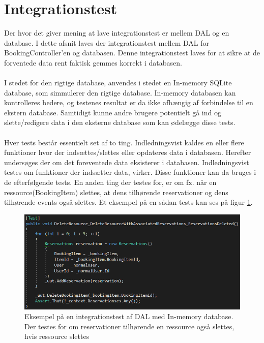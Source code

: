 \section{Integrationstest}
Der hvor det giver mening at lave integrationstest er mellem DAL og en database. I dette afsnit laves der integrationstest mellem DAL for BookingController'en og databasen. Denne integrationstest laves for at sikre at de forventede data rent faktisk gemmes korrekt i databasen. 
\\ \\
I stedet for den rigtige database, anvendes i stedet en In-memory SQLite database, som simmulerer den rigtige database. In-memory databasen kan kontrolleres bedere, og testenes resultat er da ikke afhængig af forbindelse til en ekstern database. Samtidigt kunne andre brugere potentielt gå ind og slette/redigere data i den eksterne database som kan ødelægge disse tests. 
\\ \\
Hver tests består essentielt set af to ting. Indledningsvist kaldes en eller flere funktioner hvor der indsættes/slettes eller opdateres data i databasen. Herefter undersøges der om det foreventede data eksisterer i databasen. Indledningsvist testes om funktioner der indsætter data, virker. Disse funktioner kan da bruges i de efterfølgende tests. En anden ting der testes for, er om fx. når en ressource(BookingItem) slettes, at dens tilhørende reservationer og dens tilhørende events også slettes. Et eksempel på en sådan tests kan ses på figur \ref{fig:Test_BookingDAL}.   

\begin{figure}[H]
  \includegraphics[width=\linewidth]{01_Billeder/11_Test/Booking_TestDAL.png}
  \centering
  \caption{Eksempel på en integrationstest af DAL med In-memory database. Der testes for om reservationer tilhørende en ressource også slettes, hvis ressource slettes}
  \label{fig:Test_BookingDAL}
\end{figure}

